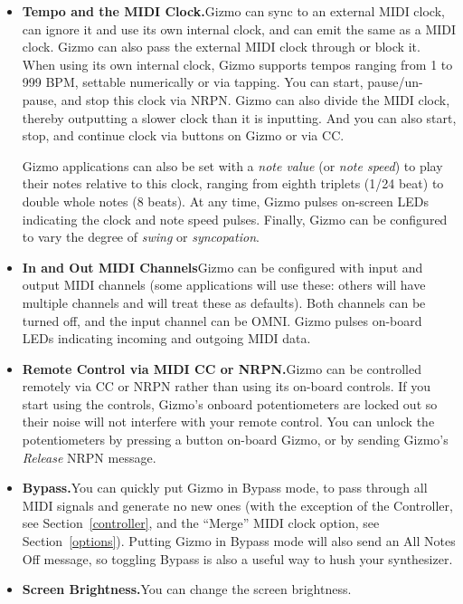 \documentclass{article}
\begin{document}
\begin{itemize}
\item {\bf Tempo and the MIDI Clock.}\quad Gizmo can sync to an external MIDI clock, can ignore it and use its own internal clock, and can emit the same as a MIDI clock.  Gizmo can also pass the external MIDI clock through or block it.  When using its own internal clock, Gizmo supports tempos ranging from 1 to 999 BPM, settable numerically or via tapping.  You can start, pause/un-pause, and stop this clock via NRPN. Gizmo can also divide the MIDI clock, thereby outputting a slower clock than it is inputting.  And you can also start, stop, and continue clock via buttons on Gizmo or via CC.

Gizmo applications can also be set with a {\it note value} (or {\it note speed}) to play their notes relative to this clock, ranging from eighth triplets (1/24 beat) to double whole notes (8 beats).  At any time, Gizmo pulses on-screen LEDs indicating the clock and note speed pulses.  Finally, Gizmo can be configured to vary the degree of {\it swing} or {\it syncopation}.

\item {\bf In and Out MIDI Channels}\quad Gizmo can be configured with input and output MIDI channels (some applications will use these: others will have multiple channels and will treat these as defaults).  Both channels can be turned off, and the input channel can be OMNI.  Gizmo pulses on-board LEDs indicating incoming and outgoing MIDI data.  

\item {\bf Remote Control via MIDI CC or NRPN.}\quad Gizmo can be controlled remotely via CC or NRPN rather than using its on-board controls.  If you start using the controls, Gizmo's onboard potentiometers are locked out so their noise will not interfere with your remote control.  You can unlock the potentiometers by pressing a button on-board Gizmo, or by sending Gizmo's {\it Release} NRPN message.  

\item {\bf Bypass.}\quad You can quickly put Gizmo in Bypass mode, to pass through all MIDI signals and generate no new ones (with the exception of the Controller, see Section~\ref{controller}, and the ``Merge'' MIDI clock option, see Section~\ref{options}).  Putting Gizmo in Bypass mode will also send an All Notes Off message, so toggling Bypass is also a useful way to hush your synthesizer.

\item {\bf Screen Brightness.}\quad You can change the screen brightness.  


\end{itemize}
\end{document}
